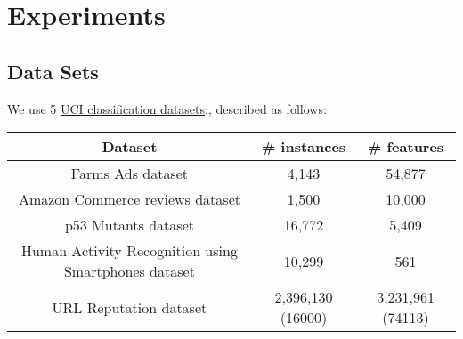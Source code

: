 \section{Experiments}
\label{sec:experiments}

\subsection{Data Sets}


We use 5 \href{http://archive.ics.uci.edu/ml/datasets.html}{UCI classification
datasets}:, described as follows:

\begin{tabular}{| c | c |  c |}
\hline
Dataset & \# instances & \# features \\
\hline
Farms Ads dataset & 4,143 & 54,877 \\
\hline
Amazon Commerce reviews dataset & 1,500 & 10,000 \\
\hline
p53 Mutants dataset & 16,772 & 5,409 \\
\hline
Human Activity Recognition using Smartphones dataset & 10,299 & 561\\
\hline
URL Reputation dataset\footnotemark[1] & 2,396,130 (16000) & 3,231,961 (74113) \\
\hline
\end{tabular}

